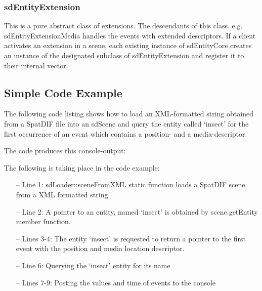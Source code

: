 \documentclass[a4paper]{article}
\begin{document}
\subsubsection{sdEntityExtension}
This is a pure abstract class of extensions. The descendants of this class. e.g. sdEntityExtensionMedia handles the events with extended descriptors. 
If a client activates an extension in a scene, each existing instance of sdEntityCore creates an instance of the designated subclass of sdEntityExtension and register it to their internal vector.

\subsection{Simple Code Example}
The following code listing shows how to load an XML-formatted string obtained from a SpatDIF file into an sdScene and query the entity called `insect' for the first occurrence of an event which contains a position- and a media-descriptor.

\vfill

 


\noindent The code produces this console-output: 
 

\noindent 
The following is taking place in the code example:

\begin{itemize}[leftmargin=*]
\item[--] Line 1: sdLoader::sceneFromXML static function loads a SpatDIF scene from a XML formatted string.
\item[--] Line 2: A pointer to an entity, named `insect' is obtained by scene.getEntity member function.
\item[--] Lines 3-4: The entity `insect' is requested to return a pointer to the first event with the position and media location descriptor.
\item[--] Line 6: Querying the `insect' entity for its name
\item[--] Lines 7-9: Posting the values and time of events to the console
\end{itemize}

\end{document}
